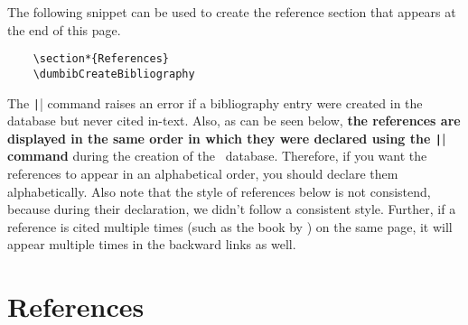 \documentclass[letter, 12pt]{article}
\begin{document}
  The following snippet can be used to create the reference section that appears at the end of this page.

  \begin{verbatim}
    \section*{References}
    \dumbibCreateBibliography
  \end{verbatim}

  The \texttt|\dumbibCreateBibliography| command raises an error if a bibliography entry were created in the database but never cited in-text. Also, as can be seen below, \textbf{the references are displayed in the same order in which they were declared using the \texttt|\dumbibReferenceEntry{}| command} during the creation of the \dumbib\ database. Therefore, if you want the references to appear in an alphabetical order, you should declare them alphabetically. Also note that the style of references below is not consistend, because during their declaration, we didn't follow a consistent style. Further, if a reference is cited multiple times (such as the book by \cite*{talagrand2022}) on the same page, it will appear multiple times in the backward links as well.

  \section*{References}
  \dumbibCreateBibliography
\end{document}
